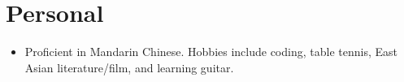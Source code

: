 \documentclass[letterpaper,11pt]{article}
\makeatletter
\newcommand{\resumeItem}[1]{
  \item\small{
    {#1} \vspace{-2pt}
  }
}
\newcommand{\resumeSubheadingTwo}[2]{
  \vspace{-1pt}\item %
    \begin{tabular*}{0.97\textwidth}{l@{\extracolsep{\fill}}r}
      \textbf{#1} & #2 \\
    \end{tabular*}\vspace{-5pt}
}
\newcommand{\resumeSubItem}[2]{\resumeItem{#1}{#2}\vspace{-4pt}}
\newcommand{\resumeSubHeadingListStart}{\begin{itemize}[leftmargin=*]}
\newcommand{\resumeSubHeadingListEnd}{\end{itemize}}
\newcommand{\resumeItemListStart}{\begin{itemize}}
\newcommand{\resumeItemListEnd}{\end{itemize}\vspace{-5pt}}
\makeatother
\begin{document}
              
        



\section{Personal}
 \resumeSubHeadingListStart
    \resumeSubItem{Proficient in Mandarin Chinese. Hobbies include coding, table tennis, East Asian literature/film, and learning guitar.}{}
 \resumeSubHeadingListEnd
\end{document}
